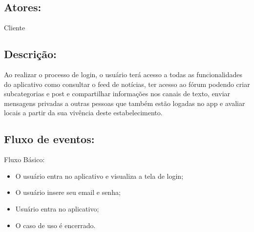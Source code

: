 \subsection{Atores:}
Cliente
\subsection{Descrição:}
Ao realizar o processo de login, o usuário terá acesso a todas as funcionalidades do aplicativo como consultar o feed de notícias, ter acesso ao fórum podendo criar subcategorias e post e compartilhar informações nos canais de texto, enviar mensagens privadas a outras pessoas que também estão logadas no app e avaliar locais a partir da sua vivência deste estabelecimento.
\subsection{Fluxo de eventos:}
Fluxo Básico:
\begin{itemize}
    \item O usuário entra no aplicativo e visualiza a tela de login;
    \item O usuário insere seu email e senha;
    \item Usuário entra no aplicativo;
    \item O caso de uso é encerrado. 
\end{itemize}

